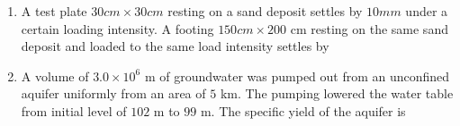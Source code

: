\documentclass[journal]{IEEEtran}
\begin{document}
\begin{enumerate}
\begin{enumerate}
\end{enumerate}

\item A test plate $30 cm \times 30 cm$ resting on a sand deposit settles by $10 mm$ under a certain loading intensity. A footing $150 cm \times 200$ cm resting on the same sand deposit and loaded to the same load intensity settles by \hfill {}

\begin{enumerate}
\end{enumerate}

\item A volume of $3.0 \times 10^{6}$ m of groundwater was pumped out from an unconfined aquifer uniformly from an area of $5$ km. The pumping lowered the water table from initial level of $102$ m to $99$ m. The specific yield of the aquifer is \hfill {}

\begin{enumerate}
\end{enumerate}


\end{enumerate}
\end{document}

